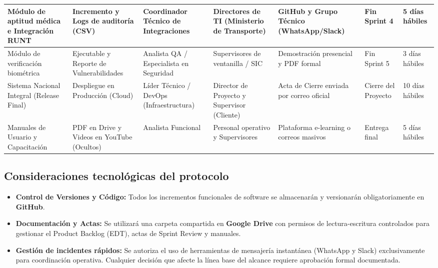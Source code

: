 \begin{table}[H]
\begin{tabular}{|p{3cm}|p{2.2cm}|p{2.5cm}|p{2.5cm}|p{2.5cm}|p{1.5cm}|p{1.5cm}|}
Módulo de aptitud médica e Integración RUNT & Incremento y Logs de auditoría (CSV) & Coordinador Técnico de Integraciones & Directores de TI (Ministerio de Transporte) & GitHub y Grupo Técnico (WhatsApp/Slack) & Fin Sprint 4 & 5 días hábiles \\ \hline

Módulo de verificación biométrica & Ejecutable y Reporte de Vulnerabilidades & Analista QA / Especialista en Seguridad & Supervisores de ventanilla / SIC & Demostración presencial y PDF formal & Fin Sprint 5 & 3 días hábiles \\ \hline

Sistema Nacional Integral (Release Final) & Despliegue en Producción (Cloud) & Líder Técnico / DevOps (Infraestructura) & Director de Proyecto y Supervisor (Cliente) & Acta de Cierre enviada por correo oficial & Cierre del Proyecto & 10 días hábiles \\ \hline

Manuales de Usuario y Capacitación & PDF en Drive y Videos en YouTube (Ocultos) & Analista Funcional & Personal operativo y Supervisores & Plataforma e-learning o correos masivos & Entrega final & 5 días hábiles \\ \hline

\end{tabular}
\end{table}

\subsection*{Consideraciones tecnológicas del protocolo}
\begin{itemize}
    \item \textbf{Control de Versiones y Código:} Todos los incrementos funcionales de software se almacenarán y versionarán obligatoriamente en \textbf{GitHub}.
    \item \textbf{Documentación y Actas:} Se utilizará una carpeta compartida en \textbf{Google Drive} con permisos de lectura-escritura controlados para gestionar el Product Backlog (EDT), actas de Sprint Review y manuales.
    \item \textbf{Gestión de incidentes rápidos:} Se autoriza el uso de herramientas de mensajería instantánea (WhatsApp y Slack) exclusivamente para coordinación operativa. Cualquier decisión que afecte la línea base del alcance requiere aprobación formal documentada.
\end{itemize}
